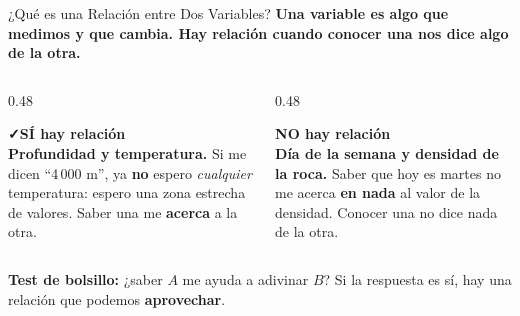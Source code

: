 \documentclass[aspectratio=169, 11pt]{beamer}
\begin{document}
\begin{frame}{¿Qué es una Relación entre Dos Variables?}
  \vspace{-6pt}
  {\small\color{arcaDark}\bfseries
    Una \textbf{variable} es algo que medimos y que cambia. Hay \textbf{relación} cuando
    conocer una nos dice algo de la otra.}

  \vspace{8pt}
  \begin{columns}[T]
    \begin{column}{0.48\textwidth}
      \begin{tcolorbox}[colback=arcaGray, colframe=codeGreen, boxrule=0pt, leftrule=3pt,
        arc=3pt, left=6pt, right=6pt, top=5pt, bottom=5pt]
        {\scriptsize\color{codeGreen}\bfseries\faCheck\hspace{4pt}SÍ hay relación}\\[4pt]
        {\scriptsize\color{textMuted}
          \textbf{Profundidad y temperatura.} Si me dicen ``4\,000 m'', ya \textbf{no}
          espero \textit{cualquier} temperatura: espero una zona estrecha de valores.
          Saber una me \textbf{acerca} a la otra.}
      \end{tcolorbox}
    \end{column}
    \begin{column}{0.48\textwidth}
      \begin{tcolorbox}[colback=arcaGray, colframe=arcaRed, boxrule=0pt, leftrule=3pt,
        arc=3pt, left=6pt, right=6pt, top=5pt, bottom=5pt]
        {\scriptsize\color{arcaRed}\bfseries\faTimes\hspace{4pt}NO hay relación}\\[4pt]
        {\scriptsize\color{textMuted}
          \textbf{Día de la semana y densidad de la roca.} Saber que hoy es martes
          no me acerca \textbf{en nada} al valor de la densidad. Conocer una
          no dice nada de la otra.}
      \end{tcolorbox}
    \end{column}
  \end{columns}

  \vspace{12pt}
  \centering
  {\footnotesize\color{arcaDark}
    \faLightbulb[regular]\hspace{4pt}\textbf{Test de bolsillo:}
    ¿saber \(A\) me ayuda a adivinar \(B\)?\quad
    Si la respuesta es sí, hay una relación que podemos \textbf{aprovechar}.}
\end{frame}
\end{document}

